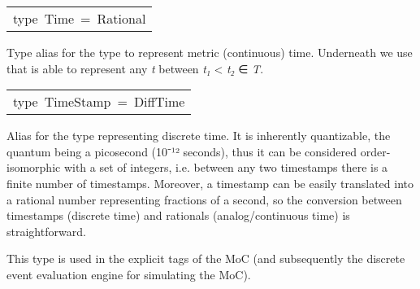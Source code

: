\begin{haddockdesc}
\item[\begin{tabular}{@{}l}
type\ Time\ =\ Rational
\end{tabular}]\haddockbegindoc
Type alias for the type to represent metric (continuous)
 time. Underneath we use  that is able to represent any
 \emph{t} between \emph{t₁} < \emph{t₂} ∈ \emph{T}.\par


\item[\begin{tabular}{@{}l}
type\ TimeStamp\ =\ DiffTime
\end{tabular}]\haddockbegindoc
Alias for the type representing discrete time. It is inherently
 quantizable, the quantum being a picosecond (10⁻¹²
 seconds), thus it can be considered order-isomorphic with a set of
 integers, i.e. between any two timestamps there is a finite number
 of timestamps. Moreover, a timestamp can be easily translated into
 a rational number representing fractions of a second, so the
 conversion between timestamps (discrete time) and rationals
 (analog/continuous time) is straightforward.\par
This type is used in the explicit tags of the
  MoC (and subsequently the discrete event
 evaluation engine for simulating the  MoC).\par

\end{haddockdesc}
